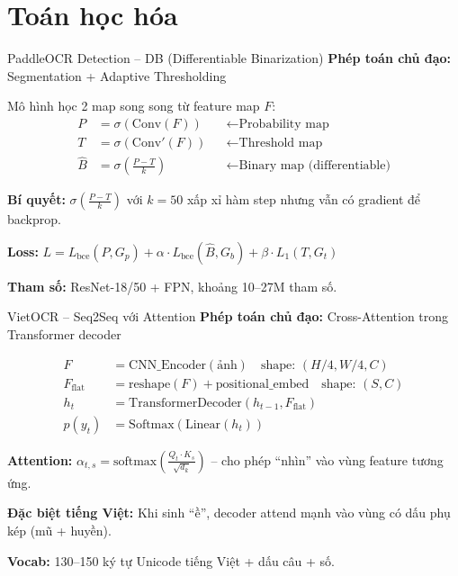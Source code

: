 \documentclass[aspectratio=169]{beamer}
\begin{document}
\section{Toán học hóa}

\begin{frame}{PaddleOCR Detection -- DB (Differentiable Binarization)}
    \textbf{Phép toán chủ đạo:} Segmentation + Adaptive Thresholding
    \vspace{0.3cm}

    Mô hình học 2 map song song từ feature map $F$:
    \begin{align*}
        P &= \sigma(\text{Conv}(F)) && \leftarrow \text{Probability map} \\
        T &= \sigma(\text{Conv}'(F)) && \leftarrow \text{Threshold map} \\
        \hat{B} &= \sigma\left(\frac{P - T}{k}\right) && \leftarrow \text{Binary map (differentiable)}
    \end{align*}
    \vspace{0.2cm}

    \textbf{Bí quyết:} $\sigma\left(\frac{P-T}{k}\right)$ với $k=50$ xấp xỉ hàm step nhưng vẫn có gradient để backprop.

    \textbf{Loss:} $L = L_{\text{bce}}(P, G_p) + \alpha \cdot L_{\text{bce}}(\hat{B}, G_b) + \beta \cdot L_1(T, G_t)$

    \textbf{Tham số:} ResNet-18/50 + FPN, khoảng 10--27M tham số.
\end{frame}

\begin{frame}{VietOCR -- Seq2Seq với Attention}
    \textbf{Phép toán chủ đạo:} Cross-Attention trong Transformer decoder
    \vspace{0.3cm}

    \begin{align*}
        F &= \text{CNN\_Encoder}(\text{ảnh}) \quad \text{shape: } (H/4, W/4, C) \\
        F_{\text{flat}} &= \text{reshape}(F) + \text{positional\_embed} \quad \text{shape: } (S, C) \\
        h_t &= \text{TransformerDecoder}(h_{t-1}, F_{\text{flat}}) \\
        p(y_t) &= \text{Softmax}(\text{Linear}(h_t))
    \end{align*}
    \vspace{0.2cm}

    \textbf{Attention:} $\alpha_{t,s} = \text{softmax}\left(\frac{Q_t \cdot K_s}{\sqrt{d_k}}\right)$ -- cho phép ``nhìn'' vào vùng feature tương ứng.

    \textbf{Đặc biệt tiếng Việt:} Khi sinh ``ề'', decoder attend mạnh vào vùng có dấu phụ kép (mũ + huyền).

    \textbf{Vocab:} 130--150 ký tự Unicode tiếng Việt + dấu câu + số.
\end{frame}
\end{document}
